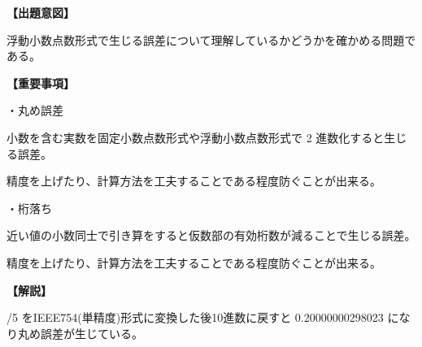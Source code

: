\noindent \textbf{【出題意図】}

\noindent 浮動小数点数形式で生じる誤差について理解しているかどうかを確かめる問題である。

\vspace{1em}
\noindent \textbf{【重要事項】}

\medskip
\noindent ・丸め誤差

\medskip
\noindent 小数を含む実数を固定小数点数形式や浮動小数点数形式で 2 進数化すると生じる誤差。

\noindent 精度を上げたり、計算方法を工夫することである程度防ぐことが出来る。

\medskip
\noindent ・桁落ち

\medskip
\noindent 近い値の小数同士で引き算をすると仮数部の有効桁数が減ることで生じる誤差。

\noindent 精度を上げたり、計算方法を工夫することである程度防ぐことが出来る。


\vspace{1em}
\noindent \textbf{【解説】}

/5 をIEEE754(単精度)形式に変換した後10進数に戻すと 0.20000000298023 になり丸め誤差が生じている。
